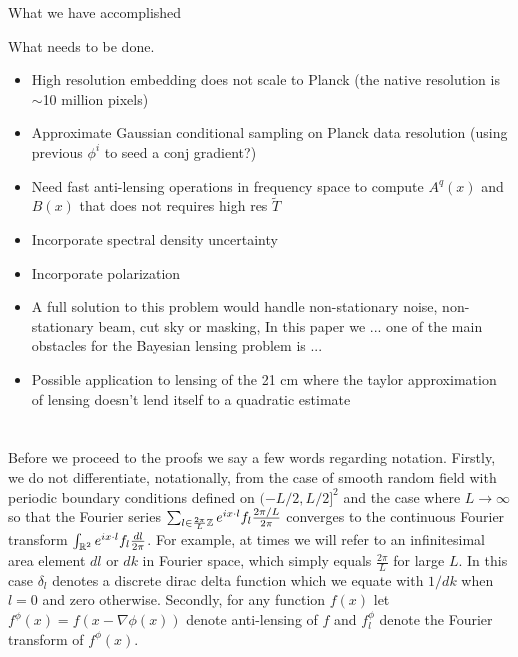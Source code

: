 \documentclass[noinfoline]{imsart}
\begin{document}
What we have accomplished

What needs to be done.
\begin{itemize}
 \item High resolution embedding does not scale to Planck (the native resolution is $\sim$10 million pixels)
\item Approximate Gaussian conditional sampling on Planck data resolution (using previous $\phi^{i}$ to seed a conj gradient?)
\item Need fast anti-lensing operations in frequency space to compute $A^q(x)$ and $B(x)$ that does not requires high res $\tilde T$
\item Incorporate spectral density uncertainty
\item Incorporate polarization
\item A full solution to this problem would handle non-stationary noise, non-stationary beam, cut sky or masking, In this paper we ... one of the main obstacles for the Bayesian lensing problem is ...
\item Possible application to lensing of the 21 cm where the taylor approximation of lensing doesn't lend itself to a quadratic estimate
\end{itemize}










%
%
\appendix

\section{}

Before we proceed to the proofs we say a few words regarding notation.
Firstly, we do not differentiate, notationally, from the case of smooth random field with periodic boundary conditions defined on $(-L/2, L/2]^2$ and the case where $L\rightarrow \infty$ so that the Fourier series $\sum_{l \in \frac{2\pi}{L}\Bbb Z }   e^{i x\cdot l}  f_l \frac{2\pi/ L}{2\pi} $ converges to the continuous Fourier transform $\int_{\Bbb R^2}  e^{i x\cdot l}  f_l \frac{dl}{2\pi} $. %
For example, at times we will refer to an infinitesimal area element $dl$ or $dk$ in Fourier space, which simply equals $\frac{2\pi}{L}$ for large $L$. In this case $\delta_l$ denotes a discrete dirac delta function which we equate with $1/dk$ when $l=0$ and zero otherwise. 
Secondly, for any function $f(x)$ let $f^\phi(x) = f(x-\nabla \phi(x))$ denote anti-lensing of $f$ and $f^\phi_l$ denote the Fourier transform of  $f^\phi(x)$.
\end{document}
